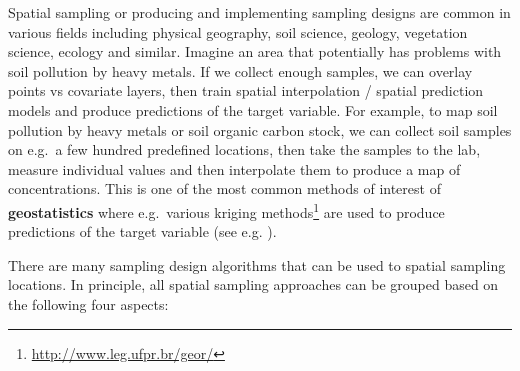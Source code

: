 \documentclass[
  graybox,natbib,nospthms]{svmono}
\renewcommand{\href}[2]{#2 (\url{#1})}
\renewcommand{\href}[2]{#2\footnote{\url{#1}}}
\begin{document}
Spatial sampling or producing and implementing sampling designs are
common in various fields including physical geography, soil science,
geology, vegetation science, ecology and similar. Imagine an area that
potentially has problems with soil pollution by heavy metals. If we
collect enough samples, we can overlay points vs covariate layers, then
train spatial interpolation / spatial prediction models and produce
predictions of the target variable. For example, to map soil pollution
by heavy metals or soil organic carbon stock, we can collect soil
samples on e.g.~a few hundred predefined locations, then take the
samples to the lab, measure individual values and then interpolate them
to produce a map of concentrations. This is one of the most common
methods of interest of \textbf{geostatistics} where e.g.~various \href{http://www.leg.ufpr.br/geor/}{kriging methods}
are used to produce predictions of the target variable (see e.g.
\citet{Bivand2013Springer}).

There are many sampling design algorithms that can be used to spatial
sampling locations. In principle, all spatial sampling approaches can be
grouped based on the following four aspects:
\end{document}
